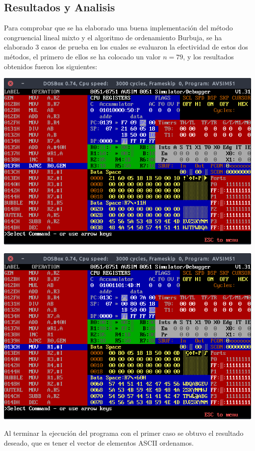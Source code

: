\documentclass[doc, donotrepeattitle, biblatex, apacite]{apa6}
\begin{document}
\subsection{Resultados y Analisis}
Para comprobar que se ha elaborado una buena implementación del método congruencial lineal
mixto y el algoritmo de ordenamiento Burbuja, se ha elaborado 3 casos de prueba en los cuales se
evaluaron la efectividad de estos dos métodos, el primero de ellos se ha colocado un valor $n=79$, y los
resultados obtenidos fueron los siguientes:
\begin{center}
\includegraphics[scale=0.5]{icler1}

\includegraphics[scale=0.5]{icler2}
\end{center}

Al terminar la ejecución del programa con el primer caso se obtuvo el resultado deseado, que es
tener el vector de elementos ASCII ordenamos.
\end{document}
